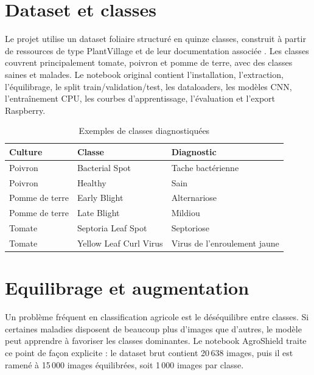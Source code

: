 ﻿\documentclass[11pt,a4paper,openany]{report}
\begin{document}
\section{Dataset et classes}
Le projet utilise un dataset foliaire structuré en quinze classes, construit à partir de ressources de type PlantVillage et de leur documentation associée \cite{plantvillage,tensorflowplantvillage}. Les classes couvrent principalement tomate, poivron et pomme de terre, avec des classes saines et malades. Le notebook original contient l'installation, l'extraction, l'équilibrage, le split train/validation/test, les dataloaders, les modèles CNN, l'entraînement CPU, les courbes d'apprentissage, l'évaluation et l'export Raspberry.

\begin{table}[H]
\centering

\begin{tabular}{|l|l|l|}
\hline
\textbf{Culture} & \textbf{Classe} & \textbf{Diagnostic} \\
\hline
Poivron & Bacterial Spot & Tache bactérienne \\
Poivron & Healthy & Sain \\
Pomme de terre & Early Blight & Alternariose \\
Pomme de terre & Late Blight & Mildiou \\
Tomate & Septoria Leaf Spot & Septoriose \\
Tomate & Yellow Leaf Curl Virus & Virus de l'enroulement jaune \\
\hline
\end{tabular}

\caption{Exemples de classes diagnostiquées}
\end{table}

\section{Equilibrage et augmentation}
Un problème fréquent en classification agricole est le déséquilibre entre classes. Si certaines maladies disposent de beaucoup plus d'images que d'autres, le modèle peut apprendre à favoriser les classes dominantes. Le notebook AgroShield traite ce point de façon explicite : le dataset brut contient 20\,638 images, puis il est ramené à 15\,000 images équilibrées, soit 1\,000 images par classe.
\end{document}
